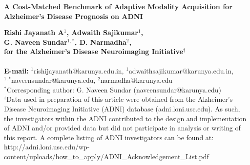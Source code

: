 \documentclass[12pt,twoside]{article}
\begin{document}
\begin{singlespace}
\begin{center}
\fontsize{24}{24}\selectfont\textbf
{A Cost-Matched Benchmark of Adaptive Modality Acquisition for Alzheimer's Disease Prognosis on ADNI}
\end{center}
\vspace{24pt}
\fontsize{16}{16}\selectfont\noindent\textbf{%
Rishi Jayanath A$^1$, Adwaith Sajikumar$^1$,\\
G. Naveen Sundar$^{1,*}$, D. Narmadha$^2$,\\
for the Alzheimer's Disease Neuroimaging Initiative$^\dagger$}
\vspace{16pt}\\
\fontsize{11}{13}\selectfont {
$^1$Division of Computer Science and Engineering, Karunya Institute of Technology and Sciences, Coimbatore, Tamil Nadu, India\\
$^2$Division of AIML, Karunya Institute of Technology and Sciences, Coimbatore, Tamil Nadu, India
}\vspace{16pt}\\
{\fontsize{9}{11}\selectfont\textbf{{E-mail:}} $^1$rishijayanath@karunya.edu.in, $^1$adwaithsajikumar@karunya.edu.in,\\
$^{1,*}$naveensundar@karunya.edu, $^2$narmadha@karunya.edu}\\[2pt]
{\fontsize{9}{11}\selectfont $^*$Corresponding author: G. Naveen Sundar (naveensundar@karunya.edu)}\\[4pt]
{\fontsize{9}{11}\selectfont $^\dagger$Data used in preparation of this article were obtained from the
Alzheimer's Disease Neuroimaging Initiative (ADNI) database (adni.loni.usc.edu). As such, the
investigators within the ADNI contributed to the design and implementation of ADNI and/or provided
data but did not participate in analysis or writing of this report. A complete listing of ADNI
investigators can be found at:
http://adni.loni.usc.edu/wp-content/uploads/how\_to\_apply/ADNI\_Acknowledgement\_List.pdf}
\end{singlespace}
\end{document}
